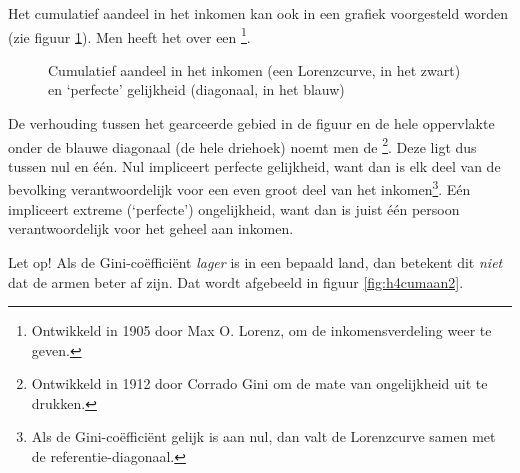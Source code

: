 Het cumulatief aandeel in het inkomen kan ook in een grafiek voorgesteld worden (zie figuur \ref{fig:h4cumaan}). Men heeft het over een \footnote{Ontwikkeld in 1905 door Max O. Lorenz, om de inkomensverdeling weer te geven.}.

\begin{figure}[H]
\centering
\captionsetup{justification=centering,margin=2cm}
\caption{Cumulatief aandeel in het inkomen (een Lorenzcurve, in het zwart) en `perfecte' gelijkheid (diagonaal, in het blauw) }
\label{fig:h4cumaan}
\end{figure}

De verhouding tussen het gearceerde gebied in de figuur en de hele oppervlakte onder de blauwe diagonaal (de hele driehoek) noemt men de \footnote{Ontwikkeld in 1912 door Corrado Gini om de mate van ongelijkheid uit te drukken.}. Deze ligt dus tussen nul en \'e\'en. Nul impliceert perfecte gelijkheid, want dan is elk deel van de bevolking verantwoordelijk voor een even groot deel van het inkomen\footnote{Als de Gini-co\"effici\"ent gelijk is aan nul, dan valt de Lorenzcurve samen met de referentie-diagonaal.}. E\'en impliceert extreme (`perfecte') ongelijkheid, want dan is juist \'e\'en persoon verantwoordelijk voor het geheel aan inkomen.\\

\par Let op! Als de Gini-co\"effici\"ent \textit{lager} is in een bepaald land, dan betekent dit \textit{niet} dat de armen beter af zijn. Dat wordt afgebeeld in figuur \ref{fig:h4cumaan2}.

